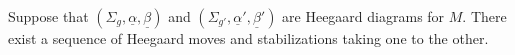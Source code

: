 

    \label{thm:heegaardMoves}
    Suppose that $(\Sigma_g,\underline \alpha, \underline \beta)$ and $(\Sigma_{g'},\underline \alpha', \underline \beta')$ are Heegaard diagrams for $M$. There exist a sequence of Heegaard moves and stabilizations taking one to the other. 
